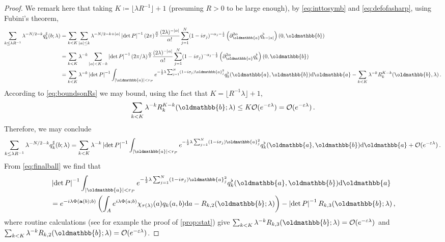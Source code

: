 \documentclass[
	fontsize=11pt, 
	twoside=false, 
	abstract=true, 
	a4paper,
]{scrartcl}
\newcommand{\eps}{\varepsilon}
\newcommand{\dd}{\mathrm{d}}
\newcommand{\abs}[1]{\left\lvert#1\right\rvert}
\newcommand{\del}{\partial}
\newcommand{\mf}[1]{\oldmathbb{#1}}
\begin{document}
\begin{proof}
	We remark here that taking $K \coloneqq \lfloor \lambda R^{-1} \rfloor + 1$ (presuming $R>0$ to be large enough), by \cref{eq:inttosymb} and \cref{eq:defofasharp}, using Fubini's theorem, {\small
	\begin{align*}
		\sum_{k\leq \lambda R^{-1}} \lambda^{-N/2-k}q^\sharp_{k}(b;\lambda) &= \sum_{k < K}\sum_{\abs{\alpha}\leq k} \lambda^{-N/2-k+ \abs{\alpha}} \abs{\det P}^{-1}(2\pi)^{\frac{N}{2}}\frac{(2\lambda)^{-\abs{\alpha}}}{\alpha!}\sum_{j=1}^{N}(1-i\sigma_j)^{-\alpha_j-\frac{1}{2}}\left(\del_{\mf{a}}^{2\alpha} q^\flat_{k-\abs{\alpha}}\right)(0,\mf{b}) \\ 
		&= \sum_{k < K}\lambda^{-k}\sum_{\abs{\alpha}< K-k} \abs{\det P}^{-1} (2\pi/\lambda)^{\frac{N}{2}}\frac{(2\lambda)^{-\abs{\alpha}}}{\alpha!}\sum_{j=1}^{N}(1-i\sigma_j)^{-\alpha_j-\frac{1}{2}}\left(\del_{\mf{a}}^{2\alpha} q^\flat_{k}\right)(0,\mf{b}) \\ 
		&=\sum_{k<K}\lambda^{-k}\abs{\det P}^{-1}\int_{\abs{\mf{a}} < r_P} e^{-\frac{1}{2}\lambda\sum_{j=1}^{N} (1-i\sigma_j)\mf{a}_j^2}q^\flat_{k}(\mf{a},\mf{b})\dd\mf{a} - \sum_{k<K}\lambda^{-k}R_{k}^{K-k}(\mf{b},\lambda)\,.%
	\end{align*}}
	According to \cref{eq:boundsonRs} we may bound, using the fact that $K = \lfloor R^{-1}\lambda \rfloor +1$,
	\[
		\sum_{k<K}\lambda^{-k}R_{k}^{K-k}(\mf{b};\lambda)\leq K \mathcal{O}(e^{-\eps\lambda}) = \mathcal{O}(e^{-\eps\lambda})\,.
	\]
	Therefore, we may conclude
	\begin{equation}\label{eq:gotonedecay}
		\sum_{k\leq \lambda R^{-1}} \lambda^{-N/2-k}q^\sharp_{k}(b;\lambda) = \sum_{k<K}\lambda^{-k}\abs{\det P}^{-1}\int_{\abs{\mf{a}} < r_P} e^{-\frac{1}{2}\lambda\sum_{j=1}^{N} (1-i\sigma_j)\mf{a}_j^2}q^\flat_{k}(\mf{a},\mf{b})\dd\mf{a} + \mathcal{O}(e^{-\eps\lambda})\,.
	\end{equation}
	From \cref{eq:finalball} we find that
	\begin{equation}\label{eq:finalball2}
		\begin{aligned}
		&{}\abs{\det P}^{-1}\int_{\abs{\mf{a}} < r_P} e^{-\frac{1}{2}\lambda\sum_{j=1}^{N} (1-i\sigma_j)\mf{a}_j^2}q^\flat_{k}(\mf{a},\mf{b})\dd\mf{a} 	\\
		&= e^{-i\lambda \Phi(\mathbf{a}(b);b)}\left(\int_A e^{i\lambda\Phi(a;b)}\chi_{\tau(\lambda)}(a) q_k(a,b)\dd a - R_{k,2}(\mf{b};\lambda)\right) - \abs{\det P}^{-1}R_{k,3}(\mf{b};\lambda)\,,
		\end{aligned}
	\end{equation}
	where routine calculations (see for example the proof of \cref{prop:stat}) give $\sum_{k<K}\lambda^{-k}R_{k,3}(\mf{b};\lambda) = \mathcal{O}(e^{-\eps\lambda})$ and $\sum_{k<K}\lambda^{-k}R_{k,2}(\mf{b};\lambda) = \mathcal{O}(e^{-\eps\lambda})$.


\end{proof}
\end{document}
